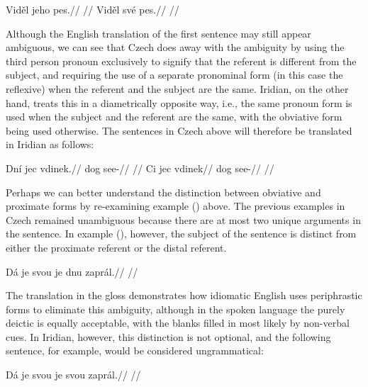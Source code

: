 \begin{multicols}{2}
  \pex
  \a
  \begingl
  \gla Vid\v{e}l jeho pes.//
  \glft {}//
  \endgl
  \a \begingl
  \gla Vid\v{e}l své pes.//
  \glft {}//
  \endgl
  \xe
\end{multicols}

Although the English translation of the first sentence may still appear ambiguous, we can see that Czech does away with the ambiguity by using the third person pronoun  exclusively to signify that the referent is different from the subject, and requiring the use of a separate pronominal form (in this case the reflexive) when the referent and the subject are the same. Iridian, on the other hand, treats this in a diametrically opposite way, i.e., the same pronoun form is used when the subject and the referent are the same, with the obviative form being used otherwise. The sentences in Czech above will therefore be translated in Iridian as follows:

\pex
\a
\begingl
\gla Dní jec vdinek.//
\glb {} dog see-//
\glft {}//
\endgl
\a \begingl
\gla Ci jec vdinek//
\glb {} dog see-//
\glft {}//
\endgl
\xe

Perhaps we can better understand the distinction between obviative and proximate forms by re-examining example () above. The previous examples in Czech remained unambiguous because there are at most two unique arguments in the sentence. In example (), however, the subject of the sentence is distinct from either the proximate referent or the distal referent.

\ex[exno={\getfullref{obv.obv1}}]
\begingl
\gla Dá je svou je dnu zaprál.//
\glft {}//
\endgl
\xe

The translation in the gloss demonstrates how idiomatic English uses periphrastic forms to eliminate this ambiguity, although in the spoken language the purely deictic  is equally acceptable, with the blanks filled in most likely by non-verbal cues. In Iridian, however, this distinction is not optional, and the following sentence, for example, would be considered ungrammatical:

\ex
\begingl
\gla *Dá je svou je svou zaprál.//
\glft {}//
\endgl
\xe

